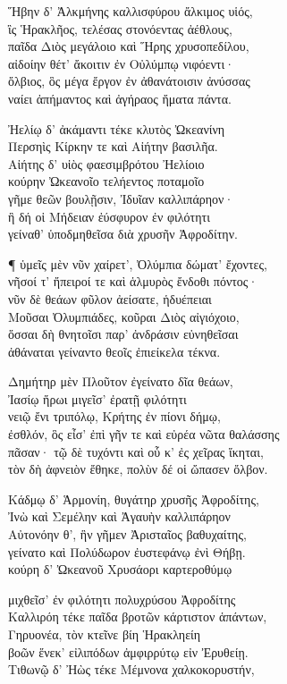 \quad{}Ἥβην δ' Ἀλκμήνης καλλισφύρου ἄλκιμος υἱός,  \\
ἲς Ἡρακλῆος, τελέσας στονόεντας ἀέθλους,\\
παῖδα Διὸς μεγάλοιο καὶ Ἥρης χρυσοπεδίλου,\\
αἰδοίην θέτ' ἄκοιτιν ἐν Οὐλύμπῳ νιφόεντι· \\
ὄλβιος, ὃς μέγα ἔργον ἐν ἀθανάτοισιν ἀνύσσας\\
ναίει ἀπήμαντος καὶ ἀγήραος ἤματα πάντα. 

\quad{}Ἠελίῳ δ' ἀκάμαντι τέκε κλυτὸς Ὠκεανίνη \\
Περσηὶς Κίρκην τε καὶ Αἰήτην βασιλῆα.\\
Αἰήτης δ' υἱὸς φαεσιμβρότου Ἠελίοιο\\
κούρην Ὠκεανοῖο τελήεντος ποταμοῖο\\
γῆμε θεῶν βουλῇσιν, Ἰδυῖαν καλλιπάρηον· \\
ἣ δή οἱ Μήδειαν ἐύσφυρον ἐν φιλότητι\\
γείναθ' ὑποδμηθεῖσα διὰ χρυσῆν Ἀφροδίτην. 

¶ ὑμεῖς μὲν νῦν χαίρετ', Ὀλύμπια δώματ' ἔχοντες, \\
νῆσοί τ' ἤπειροί τε καὶ ἁλμυρὸς ἔνδοθι πόντος· \\
νῦν δὲ θεάων φῦλον ἀείσατε, ἡδυέπειαι \\
Μοῦσαι Ὀλυμπιάδες, κοῦραι Διὸς αἰγιόχοιο,\\
ὅσσαι δὴ θνητοῖσι παρ' ἀνδράσιν εὐνηθεῖσαι\\
ἀθάναται γείναντο θεοῖς ἐπιείκελα τέκνα.

\quad{}Δημήτηρ μὲν Πλοῦτον ἐγείνατο δῖα θεάων,\\
Ἰασίῳ ἥρωι μιγεῖσ' ἐρατῇ φιλότητι  \\
νειῷ ἔνι τριπόλῳ, Κρήτης ἐν πίονι δήμῳ,\\
ἐσθλόν, ὃς εἶσ' ἐπὶ γῆν τε καὶ εὐρέα νῶτα θαλάσσης\\
πᾶσαν· τῷ δὲ τυχόντι καὶ οὗ κ' ἐς χεῖρας ἵκηται, \\
τὸν δὴ ἀφνειὸν ἔθηκε, πολὺν δέ οἱ ὤπασεν ὄλβον.

\quad{}Κάδμῳ δ' Ἁρμονίη, θυγάτηρ χρυσῆς Ἀφροδίτης, \\
Ἰνὼ καὶ Σεμέλην καὶ Ἀγαυὴν καλλιπάρηον \\
Αὐτονόην θ', ἣν γῆμεν Ἀρισταῖος βαθυχαίτης,\\
γείνατο καὶ Πολύδωρον ἐυστεφάνῳ ἐνὶ Θήβῃ.\\
κούρη δ' Ὠκεανοῦ Χρυσάορι καρτεροθύμῳ

\quad{}μιχθεῖσ' ἐν φιλότητι πολυχρύσου Ἀφροδίτης \\
Καλλιρόη τέκε παῖδα βροτῶν κάρτιστον ἁπάντων,\\
Γηρυονέα, τὸν κτεῖνε βίη Ἡρακληείη\\
βοῶν ἕνεκ' εἰλιπόδων ἀμφιρρύτῳ εἰν Ἐρυθείῃ.\\
Τιθωνῷ δ' Ἠὼς τέκε Μέμνονα χαλκοκορυστήν,


